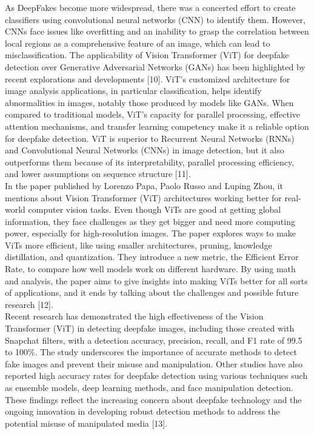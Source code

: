 As DeepFakes become more widespread, there was a concerted effort to create classifiers using convolutional neural networks (CNN) to identify them. However, CNNs face issues like overfitting and an inability to grasp the correlation between local regions as a comprehensive feature of an image, which can lead to misclassification. The applicability of Vision Transformer (ViT) for deepfake detection over Generative Adversarial Networks (GANs) has been highlighted by recent explorations and developments [10]. ViT's customized architecture for image analysis applications, in particular classification, helps identify abnormalities in images, notably those produced by models like GANs. When compared to traditional models, ViT's capacity for parallel processing, effective attention mechanisms, and transfer learning competency make it a reliable option for deepfake detection. ViT is superior to Recurrent Neural Networks (RNNs) and Convolutional Neural Networks (CNNs) in image detection, but it also outperforms them because of its interpretability, parallel processing efficiency, and lower assumptions on sequence structure [11].\\

In the paper published by Lorenzo Papa, Paolo Russo and Luping Zhou, it mentions about Vision Transformer (ViT) architectures working better for real-world computer vision tasks. Even though ViTs are good at getting global information, they face challenges as they get bigger and need more computing power, especially for high-resolution images. The paper explores ways to make ViTs more efficient, like using smaller architectures, pruning, knowledge distillation, and quantization. They introduce a new metric, the Efficient Error Rate, to compare how well models work on different hardware. By using math and analysis, the paper aims to give insights into making ViTs better for all sorts of applications, and it ends by talking about the challenges and possible future research [12].\\

Recent research has demonstrated the high effectiveness of the Vision Transformer (ViT) in detecting deepfake images, including those created with Snapchat filters, with a detection accuracy, precision, recall, and F1 rate of 99.5 to 100\%. The study underscores the importance of accurate methods to detect fake images and prevent their misuse and manipulation. Other studies have also reported high accuracy rates for deepfake detection using various techniques such as ensemble models, deep learning methods, and face manipulation detection. These findings reflect the increasing concern about deepfake technology and the ongoing innovation in developing robust detection methods to address the potential misuse of manipulated media [13].\\

